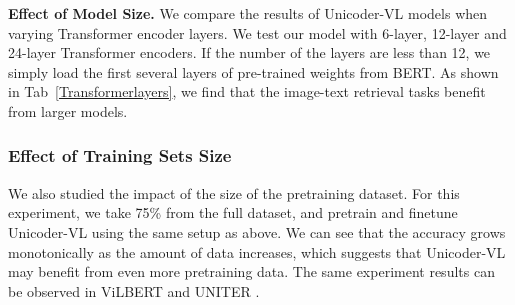 \documentclass[letterpaper]{article} \usepackage{aaai20}  \usepackage{times}  \usepackage{helvet} \usepackage{courier}  \usepackage[hyphens]{url}  \usepackage{graphicx} \urlstyle{rm} \def\UrlFont{\rm}  \usepackage{graphicx}  \frenchspacing  \setlength{\pdfpagewidth}{8.5in}  \setlength{\pdfpageheight}{11in}  \usepackage{amssymb}
\begin{document}
\textbf{Effect of Model Size.}
We compare the results of Unicoder-VL models when varying Transformer encoder layers. We test our model with 6-layer, 12-layer and 24-layer Transformer encoders. If the number of the layers are less than 12, we simply load the first several layers of pre-trained weights from BERT. As shown in Tab~\ref{Transformerlayers}, we find that the image-text retrieval tasks benefit from larger models. 
\begin{table}[!htbp]
\centering
{}
 \caption{Ablation study of the depth of Unicoder-VL with respect to the number of Transformer encoder layers. All of these experiments are fine-tuning on Flickr30k with pre-trained Unicoder-VL.}
\label{Transformerlayers}
\end{table}

\subsubsection{Effect of Training Sets Size} 
We also studied the impact of the size of the pretraining dataset. For this experiment, we take 75\% from the full dataset, and pretrain and finetune Unicoder-VL using the same setup as above. We can see that the accuracy grows monotonically as the amount of data increases, which suggests that Unicoder-VL may benefit from even more pretraining data. The same experiment results can be observed in ViLBERT \cite{lu2019vilbert} and UNITER \cite{chen2019uniter}.
\end{document}
